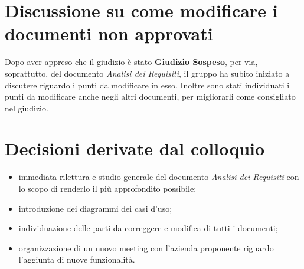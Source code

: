 \section{Discussione su come modificare i documenti non approvati}
Dopo aver appreso che il giudizio è stato \textbf{Giudizio Sospeso}, per via, soprattutto, del documento \textit{Analisi dei Requisiti}, il gruppo ha subito iniziato a discutere riguardo i punti da modificare in esso.
Inoltre sono stati individuati i punti da modificare anche negli altri documenti, per migliorarli come consigliato nel giudizio.


\section{Decisioni derivate dal colloquio}
  \begin{itemize}
    \item immediata rilettura e studio generale del documento \textit{Analisi dei Requisiti} con lo scopo di renderlo il più approfondito possibile;
    \item introduzione dei diagrammi dei casi d'uso;
    \item individuazione delle parti da correggere e modifica di tutti i documenti;
    \item organizzazione di un nuovo meeting con l'azienda proponente riguardo l'aggiunta di nuove funzionalità.
  \end{itemize}
